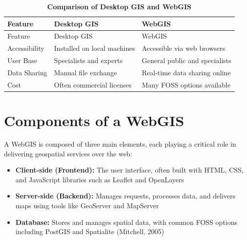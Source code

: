 \documentclass[
  11pt,
  letterpaper,
]{book}
\providecommand{\tightlist}{%
  \setlength{\itemsep}{0pt}\setlength{\parskip}{0pt}}
\begin{document}
\begin{longtable}[]{@{}
  >{\raggedright\arraybackslash}p{}
  >{\raggedright\arraybackslash}p{}
  >{\raggedright\arraybackslash}p{}@{}}
\caption{\textbf{Comparison of Desktop GIS and WebGIS}}\tabularnewline
\toprule\noalign{}
\begin{minipage}[b]{\linewidth}\raggedright
Feature
\end{minipage} & \begin{minipage}[b]{\linewidth}\raggedright
Desktop GIS
\end{minipage} & \begin{minipage}[b]{\linewidth}\raggedright
WebGIS
\end{minipage} \\
\midrule\noalign{}
\endfirsthead
\toprule\noalign{}
\begin{minipage}[b]{\linewidth}\raggedright
Feature
\end{minipage} & \begin{minipage}[b]{\linewidth}\raggedright
Desktop GIS
\end{minipage} & \begin{minipage}[b]{\linewidth}\raggedright
WebGIS
\end{minipage} \\
\midrule\noalign{}
\endhead
\bottomrule\noalign{}
\endlastfoot
Accessibility & Installed on local machines & Accessible via web
browsers \\
User Base & Specialists and experts & General public and specialists \\
Data Sharing & Manual file exchange & Real-time data sharing online \\
Cost & Often commercial licenses & Many FOSS options available \\
\end{longtable}

\section{Components of a WebGIS}\label{components-of-a-webgis}

A WebGIS is composed of three main elements, each playing a critical
role in delivering geospatial services over the web:

\begin{itemize}
\tightlist
\item
  \textbf{Client-side (Frontend):} The user interface, often built with
  HTML, CSS, and JavaScript libraries such as Leaflet and OpenLayers\\
\item
  \textbf{Server-side (Backend):} Manages requests, processes data, and
  delivers maps using tools like GeoServer and MapServer\\
\item
  \textbf{Database:} Stores and manages spatial data, with common FOSS
  options including PostGIS and Spatialite (Mitchell, 2005)
\end{itemize}
\end{document}
